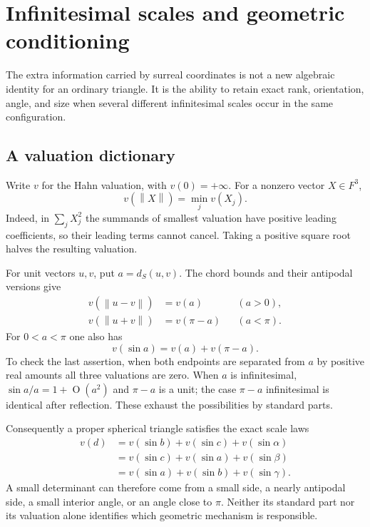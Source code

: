 \documentclass[11pt,letterpaper]{article}
\numberwithin{equation}{section}
\theoremstyle{definition}
\theoremstyle{remark}
\newcommand{\norm}[1]{\left\lVert#1\right\rVert}
\newcommand{\smallO}{\operatorname{O}}
\begin{document}
\section{Infinitesimal scales and geometric conditioning}\label{e3:sec:scales}

The extra information carried by surreal coordinates is not a new algebraic
identity for an ordinary triangle. It is the ability to retain exact rank,
orientation, angle, and size when several different infinitesimal scales
occur in the same configuration.

\subsection{A valuation dictionary}

Write $v$ for the Hahn valuation, with $v(0)=+\infty$. For a nonzero
vector $X\in F^3$,
\begin{equation}\label{e3:eq:norm-valuation}
 v(\norm X)=\min_j v(X_j).
\end{equation}
Indeed, in $\sum_jX_j^2$ the summands of smallest valuation have positive
leading coefficients, so their leading terms cannot cancel. Taking a
positive square root halves the resulting valuation.

For unit vectors $u,v$, put $a=d_S(u,v)$. The chord bounds and their
antipodal versions give
\begin{align}
 v(\norm{u-v})&=v(a) &&(a>0),\label{e3:eq:chord-val}\\
 v(\norm{u+v})&=v(\pi-a) &&(a<\pi).
\end{align}
For $0<a<\pi$ one also has
\begin{equation}\label{e3:eq:sin-val}
 v(\sin a)=v(a)+v(\pi-a).
\end{equation}
To check the last assertion, when both endpoints are separated from $a$
by positive real amounts all three valuations are zero. When $a$ is
infinitesimal, $\sin a/a=1+\smallO(a^2)$ and $\pi-a$ is a unit; the
case $\pi-a$ infinitesimal is identical after reflection. These exhaust
the possibilities by standard parts.

Consequently a proper spherical triangle satisfies the exact scale laws
\begin{equation}\label{e3:eq:triangle-val}
 \begin{split}
 v(d)&=v(\sin b)+v(\sin c)+v(\sin\alpha)\\
 &=v(\sin c)+v(\sin a)+v(\sin\beta)\\
 &=v(\sin a)+v(\sin b)+v(\sin\gamma).
 \end{split}
\end{equation}
A small determinant can therefore come from a small side, a nearly
antipodal side, a small interior angle, or an angle close to $\pi$.
Neither its standard part nor its valuation alone identifies which
geometric mechanism is responsible.
\end{document}
